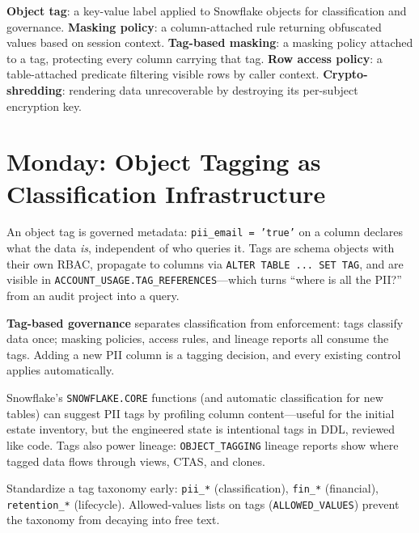 \begin{keyterms}
\textbf{Object tag}: a key-value label applied to Snowflake objects for classification and governance.\quad
\textbf{Masking policy}: a column-attached rule returning obfuscated values based on session context.\quad
\textbf{Tag-based masking}: a masking policy attached to a tag, protecting every column carrying that tag.\quad
\textbf{Row access policy}: a table-attached predicate filtering visible rows by caller context.\quad
\textbf{Crypto-shredding}: rendering data unrecoverable by destroying its per-subject encryption key.
\end{keyterms}

\section{Monday: Object Tagging as Classification Infrastructure}
An object tag is governed metadata: \texttt{pii\_email = 'true'} on a column declares what the data \emph{is}, independent of who queries it. Tags are schema objects with their own RBAC, propagate to columns via \texttt{ALTER TABLE ... SET TAG}, and are visible in \texttt{ACCOUNT\_USAGE.TAG\_REFERENCES}---which turns ``where is all the PII?'' from an audit project into a query.

\begin{definitionbox}
\textbf{Tag-based governance} separates classification from enforcement: tags classify data once; masking policies, access rules, and lineage reports all consume the tags. Adding a new PII column is a tagging decision, and every existing control applies automatically.
\end{definitionbox}

Snowflake's \texttt{SNOWFLAKE.CORE} functions (and automatic classification for new tables) can suggest PII tags by profiling column content---useful for the initial estate inventory, but the engineered state is intentional tags in DDL, reviewed like code. Tags also power lineage: \texttt{OBJECT\_TAGGING} lineage reports show where tagged data flows through views, CTAS, and clones.

\begin{tipbox}
Standardize a tag taxonomy early: \texttt{pii\_*} (classification), \texttt{fin\_*} (financial), \texttt{retention\_*} (lifecycle). Allowed-values lists on tags (\texttt{ALLOWED\_VALUES}) prevent the taxonomy from decaying into free text.
\end{tipbox}

